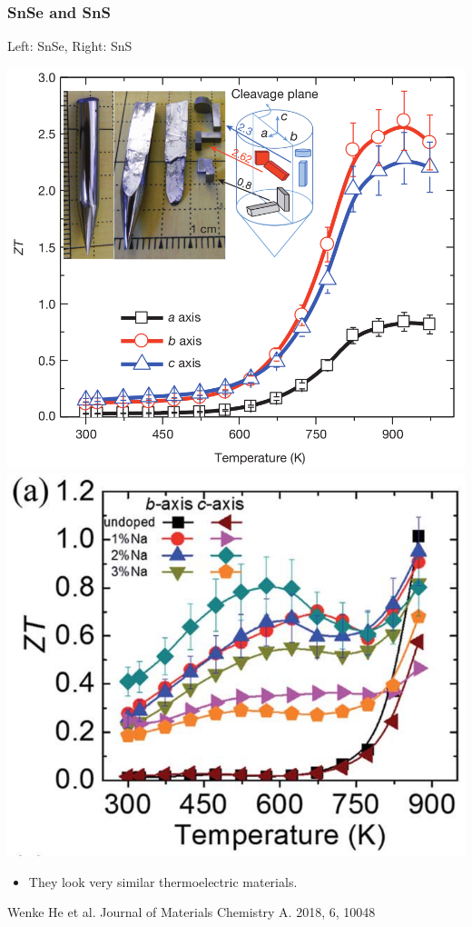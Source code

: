 \documentclass{beamer}
\begin{document}
\begin{frame}

\frametitle{SnSe and SnS}
Left: SnSe, Right: SnS
\begin{center}
\includegraphics[width=0.49\linewidth]{Pictures/SnS/ZT-SnSe.png}
\includegraphics[width=0.49\linewidth]{Pictures/SnS/ZT-SnS.png}
\end{center}
\begin{itemize}
 \item They look very similar thermoelectric materials. 
\end{itemize}
\begin{tiny}
 Wenke He et al. Journal of Materials Chemistry A. 2018, 6, 10048
\end{tiny}

\end{frame}

\end{document}
